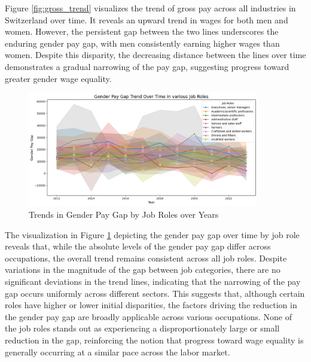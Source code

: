 \documentclass{article}
\begin{document}
Figure  \ref{fig:gross_trend} visualizes the trend of gross pay across all industries in Switzerland over time. It reveals an upward trend in wages for both men and women. However, the persistent gap between the two lines underscores the enduring gender pay gap, with men consistently earning higher wages than women. Despite this disparity, the decreasing distance between the lines over time demonstrates a gradual narrowing of the pay gap, suggesting progress toward greater gender wage equality.\\

\begin{figure}[h]
    \centering
    \includegraphics[width=0.9\textwidth]{Figures/Gap_over_Time_Roles.png}
    \caption{Trends in Gender Pay Gap by Job Roles over Years}
    \label{fig:roles_trend}
\end{figure}

 The visualization in Figure \ref{fig:roles_trend} depicting the gender pay gap over time by job role reveals that, while the absolute levels of the gender pay gap differ across occupations, the overall trend remains consistent across all job roles. Despite variations in the magnitude of the gap between job categories, there are no significant deviations in the trend lines, indicating that the narrowing of the pay gap occurs uniformly across different sectors. This suggests that, although certain roles have higher or lower initial disparities, the factors driving the reduction in the gender pay gap are broadly applicable across various occupations. None of the job roles stands out as experiencing a disproportionately large or small reduction in the gap, reinforcing the notion that progress toward wage equality is generally occurring at a similar pace across the labor market.\\
\end{document}
